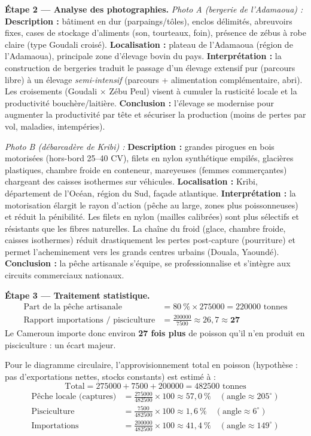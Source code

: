 \documentclass[11pt]{article}
\begin{document}
\begin{exoresolu}
\textbf{Étape 2 — Analyse des photographies.}
\emph{Photo A (bergerie de l'Adamaoua) :} \textbf{Description :} bâtiment en dur (parpaings/tôles), enclos délimités, abreuvoirs fixes, cases de stockage d'aliments (son, tourteaux, foin), présence de zébus à robe claire (type Goudali croisé). \textbf{Localisation :} plateau de l'Adamaoua (région de l'Adamaoua), principale zone d'élevage bovin du pays. \textbf{Interprétation :} la construction de bergeries traduit le passage d'un élevage extensif pur (parcours libre) à un élevage \emph{semi-intensif} (parcours + alimentation complémentaire, abri). Les croisements (Goudali $\times$ Zébu Peul) visent à cumuler la rusticité locale et la productivité bouchère/laitière. \textbf{Conclusion :} l'élevage se modernise pour augmenter la productivité par tête et sécuriser la production (moins de pertes par vol, maladies, intempéries).

\emph{Photo B (débarcadère de Kribi) :} \textbf{Description :} grandes pirogues en bois motorisées (hors-bord 25--40 CV), filets en nylon synthétique empilés, glacières plastiques, chambre froide en conteneur, mareyeuses (femmes commerçantes) chargeant des caisses isothermes sur véhicules. \textbf{Localisation :} Kribi, département de l'Océan, région du Sud, façade atlantique. \textbf{Interprétation :} la motorisation élargit le rayon d'action (pêche au large, zones plus poissonneuses) et réduit la pénibilité. Les filets en nylon (mailles calibrées) sont plus sélectifs et résistants que les fibres naturelles. La chaîne du froid (glace, chambre froide, caisses isothermes) réduit drastiquement les pertes post-capture (pourriture) et permet l'acheminement vers les grands centres urbains (Douala, Yaoundé). \textbf{Conclusion :} la pêche artisanale s'équipe, se professionnalise et s'intègre aux circuits commerciaux nationaux.

\textbf{Étape 3 — Traitement statistique.}
\begin{align*}
\text{Part de la pêche artisanale} &= 80\ \% \times \num{275000} = \num{220000} \text{ tonnes} \\
\text{Rapport importations / pisciculture} &= \frac{\num{200000}}{\num{7500}} \approx 26,7 \approx \textbf{27}
\end{align*}
Le Cameroun importe donc environ \textbf{27 fois plus} de poisson qu'il n'en produit en pisciculture : un écart majeur.

Pour le diagramme circulaire, l'approvisionnement total en poisson (hypothèse : pas d'exportations nettes, stocks constants) est estimé à :
\[ \text{Total} = \num{275000} + \num{7500} + \num{200000} = \num{482500} \text{ tonnes} \]
\begin{align*}
\text{Pêche locale (captures)} &= \frac{\num{275000}}{\num{482500}} \times 100 \approx 57,0\ \% \quad (\text{angle} \approx 205^\circ) \\
\text{Pisciculture} &= \frac{\num{7500}}{\num{482500}} \times 100 \approx 1,6\ \% \quad (\text{angle} \approx 6^\circ) \\
\text{Importations} &= \frac{\num{200000}}{\num{482500}} \times 100 \approx 41,4\ \% \quad (\text{angle} \approx 149^\circ)
\end{align*}


\end{exoresolu}
\end{document}
